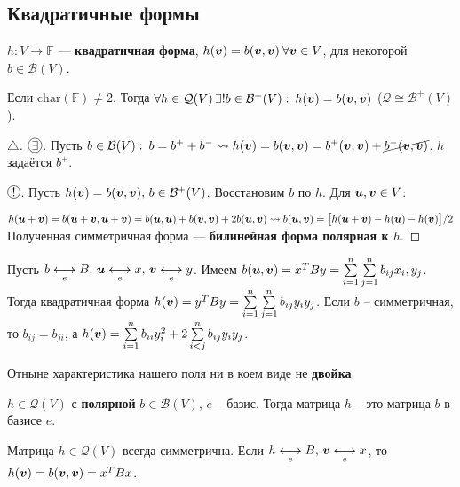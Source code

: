 \subsection{Квадратичные формы}
\begin{to_def} 
	$h \colon V \to \mathbb{F}$ --- \textbf{квадратичная форма}, $h(\mbox{\boldmath $v$}) = b(\mbox{\boldmath $v$},\mbox{\boldmath $v$}) \: \forall \mbox{\boldmath $v$} \in V$, для некоторой $b \in \mathcal{B}(V)$.
\end{to_def}

\begin{to_thr} 
	Если $\text{char}(\mathbb{F}) \neq 2$. Тогда $\forall h \in \mathcal{Q}(V)\, \exists! b \in \mathcal{B}^+(V): \: h(\mbox{\boldmath $v$}) = b(\mbox{\boldmath $v$},\mbox{\boldmath $v$})$ ($\mathcal{Q} \cong \mathcal{B}^+(V)$).
\end{to_thr}

\begin{proof}[$\triangle$]
	$\encircled{\exists}$. Пусть $b \in \mathcal{B}(V):\: b = b^+ + b^- \leadsto h(\mbox{\boldmath $v$}) = b(\mbox{\boldmath $v$},\mbox{\boldmath $v$}) = b^+(\mbox{\boldmath $v$},\mbox{\boldmath $v$}) + \cancel{b^-(\mbox{\boldmath $v$},\mbox{\boldmath $v$})}$. $h$ задаётся $b^+$.

	$\encircled{!}$. Пусть $h(\mbox{\boldmath $v$}) = b(\mbox{\boldmath $v$},\mbox{\boldmath $v$}), \, b \in \mathcal{B}^+(V)$. Восстановим $b$ по $h$. Для $\mbox{\boldmath $u$},\mbox{\boldmath $v$} \in V$:

	$h(\mbox{\boldmath $u$} + \mbox{\boldmath $v$}) = b (\mbox{\boldmath $u$} + \mbox{\boldmath $v$}, \mbox{\boldmath $u$} + \mbox{\boldmath $v$}) = b(\mbox{\boldmath $u$},\mbox{\boldmath $u$}) + b(\mbox{\boldmath $v$},\mbox{\boldmath $v$}) + 2 b (\mbox{\boldmath $u$}, \mbox{\boldmath $v$}) \leadsto b(\mbox{\boldmath $u$},\mbox{\boldmath $v$}) = \big[h(\mbox{\boldmath $u$}+\mbox{\boldmath $v$}) - h(\mbox{\boldmath $u$}) - h(\mbox{\boldmath $v$})\big]/2$\\
	Полученная симметричная форма --- \textbf{билинейная форма полярная к $h$}.
\end{proof}

Пусть $b \underset{e}{\longleftrightarrow} B, \, \mbox{\boldmath $u$} \underset{e}{\longleftrightarrow} x, \, \mbox{\boldmath $v$} \underset{e}{\longleftrightarrow} y$. Имеем $b(\mbox{\boldmath $u$},\mbox{\boldmath $v$}) = x^T B y = \sum\limits_{ i=1 }^{ n } \sum\limits_{ j=1 }^{ n } b_{i j} x_i, y_j$. Тогда квадратичная форма $h (\mbox{\boldmath $v$}) = y^T B y = \sum\limits_{ i=1 }^{ n } \sum\limits_{ j=1 }^{ n } b_{i j}y_i y_j$. Если $b$ -- симметричная, то $b_{ i j} = b_{j i}$, а $h(\mbox{\boldmath $v$}) = \sum\limits_{ i=1 }^{ n } b_{i i} y_i^2 + 2 \sum\limits_{ i<j }^{ n } b_{i j} y_i y_j$.

Отныне характеристика нашего поля ни в коем виде не \textbf{двойка}.

\begin{to_def} 
	 $h \in \mathcal{Q}(V)$ с \textbf{полярной} $b \in \mathcal{B}(V)$, $e$ -- базис. Тогда матрица $h$ -- это матрица $b$  в базисе $e$.

	 Матрица $h \in \mathcal{Q}(V)$ всегда симметрична. Если $h \underset{e}{\longleftrightarrow} B, \, \mbox{\boldmath $v$} \underset{e}{\longleftrightarrow} x$, то $h(\mbox{\boldmath $v$}) = b(\mbox{\boldmath $v$}, \mbox{\boldmath $v$}) = x^T B x$.
\end{to_def}

